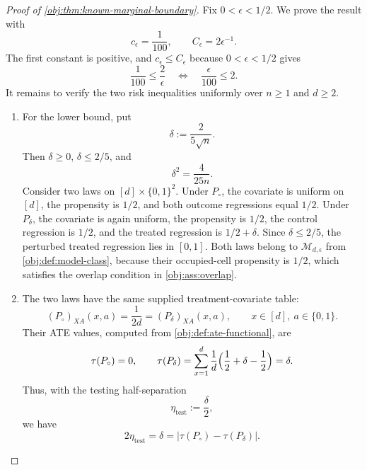 \begin{proof}[Proof of \cref{obj:thm:known-marginal-boundary}]
Fix \(0<\epsilon<1/2\).  We prove the result with
\[
c_\epsilon=\frac1{100},
\qquad
C_\epsilon=2\epsilon^{-1}.
\]
The first constant is positive, and \(c_\epsilon\le C_\epsilon\) because \(0<\epsilon<1/2\) gives
\[
\frac1{100}\le \frac{2}{\epsilon}
\quad\Longleftrightarrow\quad
\frac{\epsilon}{100}\le 2 .
\]
It remains to verify the two risk inequalities uniformly over \(n\ge1\) and \(d\ge2\). %

\begin{enumerate}
\item
For the lower bound, put
\[
\delta:=\frac{2}{5\sqrt n}.
\]
Then \(\delta\ge0\), \(\delta\le2/5\), and
\[
\delta^2=\frac{4}{25n}.
\]
Consider two laws on \([d]\times\{0,1\}^2\).  Under \(P_{\circ}\), the covariate is uniform on \([d]\), the propensity is \(1/2\), and both outcome regressions equal \(1/2\).  Under \(P_{\delta}\), the covariate is again uniform, the propensity is \(1/2\), the control regression is \(1/2\), and the treated regression is \(1/2+\delta\).  Since \(\delta\le2/5\), the perturbed treated regression lies in \([0,1]\).  Both laws belong to \(\mathcal M_{d,\epsilon}\) from \cref{obj:def:model-class}, because their occupied-cell propensity is \(1/2\), which satisfies the overlap condition in \cref{obj:ass:overlap}. %

\item
The two laws have the same supplied treatment-covariate table:
\[
(P_{\circ})_{XA}(x,a)=\frac{1}{2d}=(P_{\delta})_{XA}(x,a),
\qquad x\in[d],\ a\in\{0,1\}.
\]
Their ATE values, computed from \cref{obj:def:ate-functional}, are
\[
\tau(P_{\circ})=0,
\qquad
\tau(P_{\delta})
=\sum_{x=1}^d \frac1d\Bigl(\frac12+\delta-\frac12\Bigr)
=\delta .
\]
Thus, with the testing half-separation
\[
\eta_{\mathrm{test}}:=\frac{\delta}{2},
\]
we have
\[
2\eta_{\mathrm{test}}=\delta
=\bigl|\tau(P_{\circ})-\tau(P_{\delta})\bigr|.
\]


\end{enumerate}
\end{proof}
